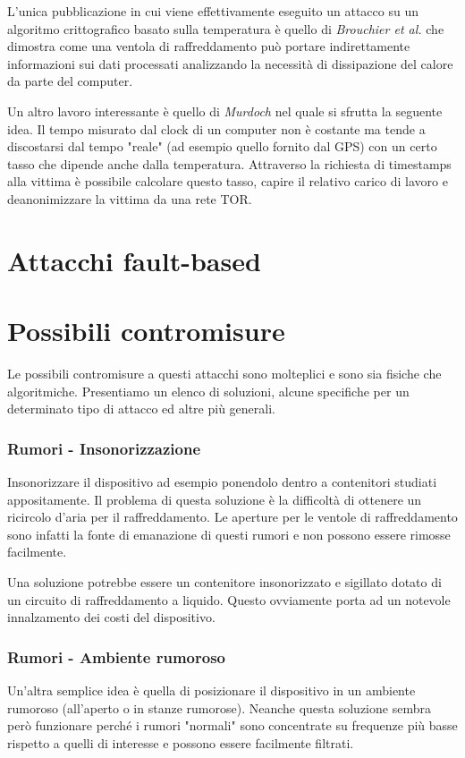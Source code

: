 		L'unica pubblicazione in cui viene effettivamente eseguito un attacco su un algoritmo crittografico basato sulla temperatura è quello di \emph{Brouchier et al.}\cite{brouchier2009temperature} che dimostra come una ventola di raffreddamento può portare indirettamente informazioni sui dati processati analizzando la necessità di dissipazione del calore da parte del computer.
		
		Un altro lavoro interessante è quello di \emph{Murdoch}\cite{murdoch2006hot} nel quale si sfrutta la seguente idea. Il tempo misurato dal clock di un computer non è costante ma tende a discostarsi dal tempo "reale" (ad esempio quello fornito dal \ac{GPS}) con un certo tasso che dipende anche dalla temperatura\cite{buracchi2015tri}. Attraverso la richiesta di timestamps alla vittima è possibile calcolare questo tasso, capire il relativo carico di lavoro e deanonimizzare la vittima da una rete \ac{TOR}.
		
	\section{Attacchi fault-based}
	\lipsum[1-5]
	\section{Possibili contromisure}	
		Le possibili contromisure a questi attacchi sono molteplici e sono sia fisiche che algoritmiche. Presentiamo un elenco di soluzioni, alcune specifiche per un determinato tipo di attacco ed altre più generali.
		
		\subsubsection*{Rumori - Insonorizzazione}			
			Insonorizzare il dispositivo ad esempio ponendolo dentro a contenitori studiati appositamente. Il problema di questa soluzione è la difficoltà di ottenere un ricircolo d'aria per il raffreddamento. Le aperture per le ventole di raffreddamento sono infatti la fonte di emanazione di questi rumori e non possono essere rimosse facilmente. 
			
			Una soluzione potrebbe essere un contenitore insonorizzato e sigillato dotato di un circuito di raffreddamento a liquido. Questo ovviamente porta ad un notevole innalzamento dei costi del dispositivo.
		
		\subsubsection*{Rumori - Ambiente rumoroso}
			Un'altra semplice idea è quella di posizionare il dispositivo in un ambiente rumoroso (all'aperto o in stanze rumorose). Neanche questa soluzione sembra però funzionare perché i rumori "normali" sono concentrate su frequenze più basse rispetto a quelli di interesse e possono essere facilmente filtrati.
			
